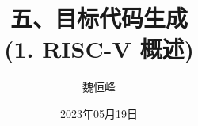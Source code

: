 \documentclass[]{beamer}
\title[目标代码生成]{五、目标代码生成 \\ (1. RISC-V 概述)}
\author[魏恒峰]{\large 魏恒峰}
\institute{hfwei@nju.edu.cn}
\date{2023年05月19日}
\begin{document}
\maketitle



\thankyou{}

\end{document}
